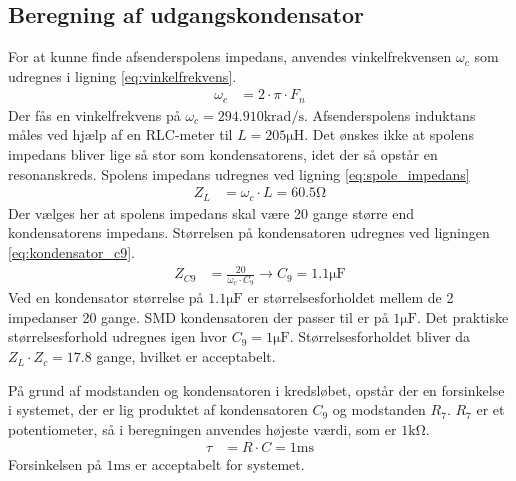 \subsection{Beregning af udgangskondensator}
For at kunne finde afsenderspolens impedans, anvendes vinkelfrekvensen $\omega_c$ som udregnes i ligning \ref{eq:vinkelfrekvens}.
\begin{align}
	\omega_c & = 2 \cdot \pi \cdot F_n \label{eq:vinkelfrekvens}
\end{align}
Der fås en vinkelfrekvens på $\omega_c = 294.910\si{\kilo\radian\per\second}$.
Afsenderspolens induktans måles ved hjælp af en RLC-meter til $L = 205\si{\micro \henry}$.
Det ønskes ikke at spolens impedans bliver lige så stor som kondensatorens, idet der så opstår en resonanskreds. 
Spolens impedans udregnes ved ligning \ref{eq:spole_impedans}
\begin{align}
	Z_L & = \omega_c \cdot L = 60.5 \si{\ohm} \label{eq:spole_impedans}
\end{align}
Der vælges her at spolens impedans skal være 20 gange større end kondensatorens impedans. Størrelsen på kondensatoren udregnes ved ligningen \ref{eq:kondensator_c9}.
\begin{align}
	Z_{C9} & = \frac{20}{\omega_c \cdot C_9} \rightarrow C_9 = 1.1 \si{\micro\farad} \label{eq:kondensator_c9}
\end{align}
Ved en kondensator størrelse på $1.1\si{\micro\farad}$ er størrelsesforholdet mellem de 2 impedanser 20 gange. 
SMD kondensatoren der passer til er på $1\si{\micro\farad}$. Det praktiske størrelsesforhold udregnes igen hvor $C_9 = 1\si{\micro\farad}$. Størrelsesforholdet bliver da $Z_L \cdot Z_c = 17.8$ gange, hvilket er acceptabelt.

På grund af modstanden og kondensatoren i kredsløbet, opstår der en forsinkelse i systemet, der er lig produktet af kondensatoren $C_9$ og modstanden $R_7$. $R_7$ er et potentiometer, så i beregningen anvendes højeste værdi, som er $1\si{\kilo\ohm}$.
\begin{align}
	\tau & = R \cdot C = 1 \si{\milli\second}
\end{align}
Forsinkelsen på $1 \si{\milli\second}$ er acceptabelt for systemet.


